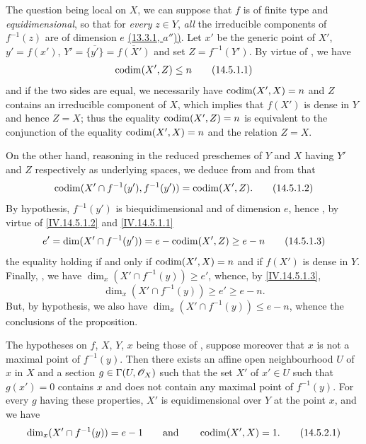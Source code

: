 The question being local on $X$, we can suppose that $f$ is of finite type and \emph{equidimensional}, so that for \emph{every} $z\in Y$, \emph{all} the irreducible components of $f^{-1}(z)$ are of dimension $e$ {\hyperref[IV.13.3.1]{(13.3.1, $a''$))}}.
Let $x'$ be the generic point of $X'$, $y'=f(x')$, $Y'=\overline{\{y'\}}=\overline{f(X')}$ and set $Z=f^{-1}(Y')$.
By virtue of , we have
\begin{equation}
  \operatorname{codim}(X',Z)\leq n
  \tag{14.5.1.1}\label{IV.14.5.1.1}
\end{equation}
and if the two sides are equal, we necessarily have $\operatorname{codim}(X',X)=n$ and $Z$ contains an irreducible component of $X$, which implies  that $f(X')$ is dense in $Y$ and hence $Z=X$; thus the equality $\operatorname{codim}(X',Z)=n$ is equivalent to the conjunction of the equality $\operatorname{codim}(X',X)=n$ and the relation $Z=X$.

On the other hand, reasoning in the reduced preschemes of $Y$ and $X$ having $Y'$ and $Z$ respectively as underlying spaces, we deduce from  and from  that
\begin{equation}
  \operatorname{codim}(X'\cap f^{-1}(y'),f^{-1}(y'))=\operatorname{codim}(X',Z).
  \tag{14.5.1.2}\label{IV.14.5.1.2}
\end{equation}
By hypothesis, $f^{-1}(y')$ is biequidimensional  and of dimension $e$, hence , by virtue of \eqref{IV.14.5.1.2} and \eqref{IV.14.5.1.1}
\begin{equation}
  e'=\dim(X'\cap f^{-1}(y'))=e-\operatorname{codim}(X',Z)\geq e-n
  \tag{14.5.1.3}\label{IV.14.5.1.3}
\end{equation}
the equality holding if and only if $\operatorname{codim}(X',X)=n$ and if $f(X')$ is dense in $Y$.
Finally, , we have $\dim_x(X'\cap f^{-1}(y))\geq e'$, whence, by \eqref{IV.14.5.1.3},
\begin{equation}
  \dim_x(X'\cap f^{-1}(y))\geq e'\geq e-n.
  \tag{14.5.1.4}\label{IV.14.5.1.4}
\end{equation}
But, by hypothesis, we also have $\dim_x(X'\cap f^{-1}(y))\leq e-n$, whence the conclusions of the proposition.

\begin{corollary}[14.5.2]
\label{IV.14.5.2}
The hypotheses on $f$, $X$, $Y$, $x$ being those of , suppose moreover that $x$ is not a maximal point of $f^{-1}(y)$.
Then there exists an affine open neighbourhood $U$ of $x$ in $X$ and a section $g\in\Gamma(U,\mathscr{O}_X)$ such that the set $X'$ of $x'\in U$ such that $g(x')=0$ contains $x$ and does not contain any maximal point of $f^{-1}(y)$.
For every $g$ having these properties, $X'$ is equidimensional over $Y$ at the point $x$, and we have
\begin{equation}
  \dim_x(X'\cap f^{-1}(y))=e-1 \qquad\text{and}\qquad \operatorname{codim}(X',X)=1.
  \tag{14.5.2.1}\label{IV.14.5.2.1}
\end{equation}
\end{corollary}

